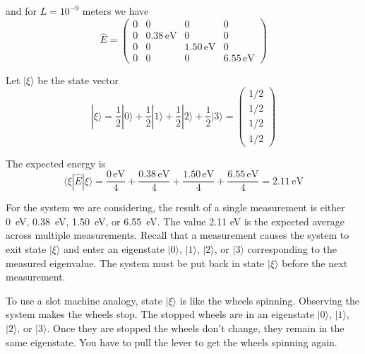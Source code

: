 \documentclass[12pt]{article}
\begin{document}
\noindent
and for $L=10^{-9}$ meters we have
\begin{equation*}
\hat{E}=\begin{pmatrix}
0&0&0&0\\
0&0.38\,\text{eV}&0&0\\
0&0&1.50\,\text{eV}&0\\
0&0&0&6.55\,\text{eV}
\end{pmatrix}
\end{equation*}

\noindent
Let $|\xi\rangle$ be the state vector
\begin{equation*}
|\xi\rangle
=\frac{1}{2}|0\rangle+\frac{1}{2}|1\rangle+\frac{1}{2}|2\rangle+\frac{1}{2}|3\rangle
=\begin{pmatrix}1/2\\1/2\\1/2\\1/2\end{pmatrix}
\end{equation*}

\noindent
The expected energy is
\begin{equation*}
\langle\xi|\hat{E}|\xi\rangle
=\frac{0\,\text{eV}}{4}+\frac{0.38\,\text{eV}}{4}+\frac{1.50\,\text{eV}}{4}+\frac{6.55\,\text{eV}}{4}
=2.11\,\text{eV}
\end{equation*}

\noindent
For the system we are considering, the result of a single measurement is either
0~eV, 0.38~eV, 1.50~eV, or 6.55~eV.
The value 2.11 eV is the expected average across multiple measurements.
Recall that a measurement causes the system to exit state $|\xi\rangle$
and enter an eigenstate $|0\rangle$, $|1\rangle$, $|2\rangle$, or $|3\rangle$
corresponding to the measured eigenvalue.
The system must be put back in state $|\xi\rangle$ before the next measurement.

\bigskip
\noindent
To use a slot machine analogy, state $|\xi\rangle$ is like the wheels spinning.
Observing the system makes the wheels stop.
The stopped wheels are in an eigenstate $|0\rangle$, $|1\rangle$, $|2\rangle$, or $|3\rangle$.
Once they are stopped the wheels don't change, they remain in the same eigenstate.
You have to pull the lever to get the wheels spinning again.
\end{document}
